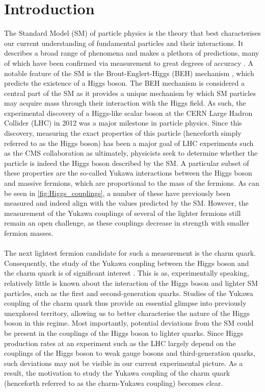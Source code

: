 \chapter{Introduction}
The Standard Model (SM) of particle physics is the theory that best characterises our current understanding of fundamental particles and their interactions. It describes a broad range of phenomena and makes a plethora of predictions, many of which have been confirmed via measurement to great degrees of accuracy \cite{PhysRevD.110.030001}. A notable feature of the SM is the Brout-Englert-Higgs (BEH) mechanism \cite{Higgs}\cite{EnglertBrout}, which predicts the existence of a Higgs boson. The BEH mechanism is considered a central part of the SM as it provides a unique mechanism by which SM particles may acquire mass through their interaction with the Higgs field. As such, the experimental discovery of a Higgs-like scalar boson at the CERN Large Hadron Collider (LHC) in 2012 \cite{HiggsDiscovery2012CMS}\cite{HiggsDiscovery2012ATLAS} was a major milestone in particle physics. Since this discovery, measuring the exact properties of this particle (henceforth simply referred to as the Higgs boson) has been a major goal of LHC experiments such as the CMS collaboration \cite{CMS_Collaboration2022-xw} as ultimately, physicists seek to determine whether the particle is indeed the Higgs boson described by the SM. A particular subset of these properties are the so-called Yukawa interactions between the Higgs boson and massive fermions, which are proportional to the mass of the fermions. As can be seen in \autoref{fig:Higgs_couplings}, a number of these have previously been measured and indeed align with the values predicted by the SM. However, the measurement of the Yukawa couplings of several of the lighter fermions still remain an open challenge, as these couplings decrease in strength with smaller fermion masses. \\
\\
The next lightest fermion candidate for such a measurement is the charm quark. Consequently, the study of the Yukawa coupling between the Higgs boson and the charm quark is of significant interest \cite{PhysRevD.100.073013}. This is as, experimentally speaking, relatively little is known about the interaction of the Higgs boson and lighter SM particles, such as the first and second-generation quarks. Studies of the Yukawa coupling of the charm quark thus provide an essential glimpse into previously unexplored territory, allowing us to better characterise the nature of the Higgs boson in this regime. Most importantly, potential deviations from the SM could be present in the couplings of the Higgs boson to lighter quarks. Since Higgs production rates at an experiment such as the LHC largely depend on the couplings of the Higgs boson to weak gauge bosons and third-generation quarks, such deviations may not be visible in our current experimental picture. As a result, the motivation to study the Yukawa coupling of the charm quark (henceforth referred to as the charm-Yukawa coupling) becomes clear. \\
